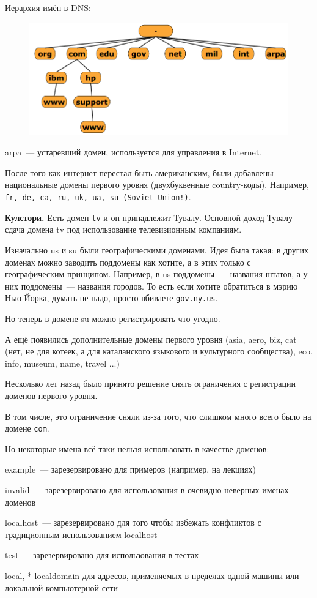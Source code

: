 Иерархия имён в DNS:

\begin{figure}[H]
  \centering
  \includegraphics[width=15cm]{images/05/01}
\end{figure}

arpa~--- устаревший домен, используется для управления в Internet.

После того как интернет перестал быть американским, были добавлены национальные домены первого уровня (двухбуквенные country-коды). Например, {\tt fr, de, ca, ru, uk, ua, su (Soviet Union!)}.

{\bf Кулстори.} Есть домен {\tt tv} и он принадлежит Тувалу. Основной доход Тувалу~--- сдача домена tv под использование телевизионным компаниям.

Изначально us и su были географическими доменами. Идея была такая: в других доменах можно заводить поддомены как хотите, а в этих только с географическим принципом. Например, в us поддомены~--- названия штатов, а у них поддомены~--- названия городов. То есть если хотите обратиться в мэрию Нью-Йорка, думать не надо, просто вбиваете {\tt gov.ny.us}.

Но теперь в домене su можно регистрировать что угодно.

А ещё появились дополнительные домены первого уровня (asia, aero, biz, cat (нет, не для котеек, а для каталанского языкового и культурного сообщества), eco, info, museum, name, travel ...)

Несколько лет назад было принято решение снять ограничения с регистрации доменов первого уровня.

В том числе, это ограничение сняли из-за того, что слишком много всего было на домене {\tt com}.

Но некоторые имена всё-таки нельзя использовать в качестве доменов:
\begin{MyItemize}
    \item example~--- зарезервировано для примеров (например, на лекциях) 
    \item invalid~--- зарезервировано для использования в очевидно неверных именах доменов 
    \item localhost~--- зарезервировано для того чтобы избежать конфликтов с традиционным использованием localhost
    \item test — зарезервировано для использования в тестах
    \item * local, * localdomain для адресов, применяемых в пределах одной машины или локальной компьютерной сети
\end{MyItemize}

